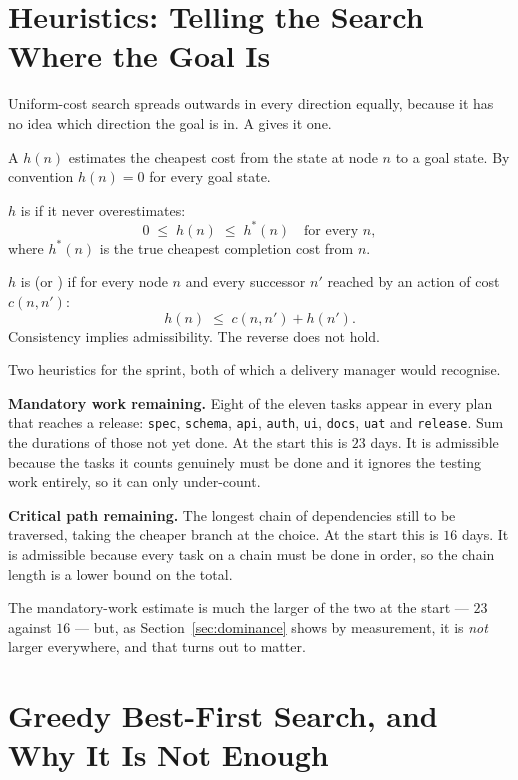 \section{Heuristics: Telling the Search Where the Goal Is}

Uniform-cost search spreads outwards in every direction equally, because it has no
idea which direction the goal is in. A  gives it one.

\begin{definitionbox}
A  $h(n)$ estimates the cheapest cost from the state at node $n$ to
a goal state. By convention $h(n) = 0$ for every goal state.

$h$ is  if it never overestimates:
\[
  0 \;\le\; h(n) \;\le\; h^{*}(n) \quad\text{for every } n,
\]
where $h^{*}(n)$ is the true cheapest completion cost from $n$.

$h$ is  (or ) if for every node $n$ and every
successor $n'$ reached by an action of cost $c(n,n')$:
\[
  h(n) \;\le\; c(n,n') + h(n').
\]
Consistency implies admissibility. The reverse does not hold.
\end{definitionbox}

Two heuristics for the sprint, both of which a delivery manager would recognise.

\textbf{Mandatory work remaining.} Eight of the eleven tasks appear in every plan
that reaches a release: \texttt{spec}, \texttt{schema}, \texttt{api},
\texttt{auth}, \texttt{ui}, \texttt{docs}, \texttt{uat} and \texttt{release}. Sum
the durations of those not yet done. At the start this is $23$ days. It is
admissible because the tasks it counts genuinely must be done and it ignores the
testing work entirely, so it can only under-count.

\textbf{Critical path remaining.} The longest chain of dependencies still to be
traversed, taking the cheaper branch at the choice. At the start this is $16$ days.
It is admissible because every task on a chain must be done in order, so the chain
length is a lower bound on the total.

The mandatory-work estimate is much the larger of the two at the start --- $23$
against $16$ --- but, as Section~\ref{sec:dominance} shows by measurement, it is
\emph{not} larger everywhere, and that turns out to matter.

\section{Greedy Best-First Search, and Why It Is Not Enough}

